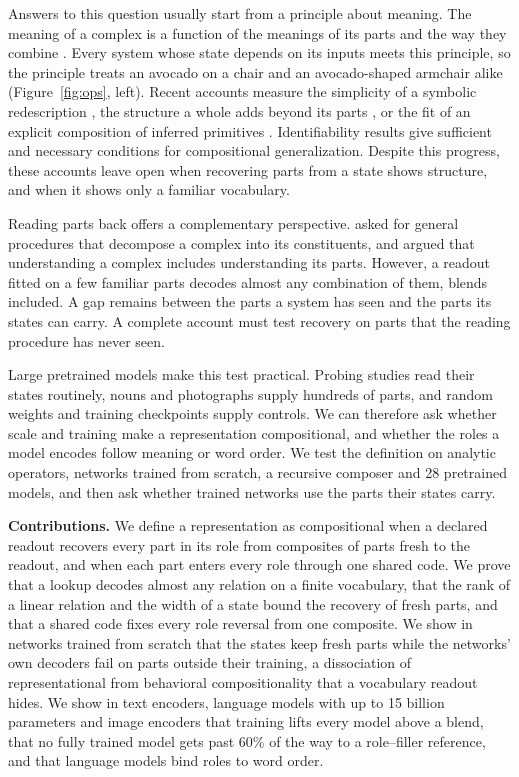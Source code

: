 \documentclass[10pt]{article}
\theoremstyle{plain}
\theoremstyle{remark}
\begin{document}
Answers to this question usually start from a principle about meaning. The meaning of a complex is a function of the meanings of its parts and the way they combine \citep{montague1970}. Every system whose state depends on its inputs meets this principle, so the principle treats an avocado on a chair and an avocado-shaped armchair alike (Figure~\ref{fig:ops}, left). Recent accounts measure the simplicity of a symbolic redescription \citep{elmoznino2024}, the structure a whole adds beyond its parts \citep{elmoznino2026}, or the fit of an explicit composition of inferred primitives \citep{andreas2019}. Identifiability results give sufficient \citep{lachapelle2023,wiedemer2024} and necessary \citep{uselis2026} conditions for compositional generalization. Despite this progress, these accounts leave open when recovering parts from a state shows structure, and when it shows only a familiar vocabulary.

Reading parts back offers a complementary perspective. \citet{vangelder1990} asked for general procedures that decompose a complex into its constituents, and \citet{fodor2002} argued that understanding a complex includes understanding its parts. However, a readout fitted on a few familiar parts decodes almost any combination of them, blends included. A gap remains between the parts a system has seen and the parts its states can carry. A complete account must test recovery on parts that the reading procedure has never seen.

Large pretrained models make this test practical. Probing studies read their states routinely, nouns and photographs supply hundreds of parts, and random weights and training checkpoints supply controls. We can therefore ask whether scale and training make a representation compositional, and whether the roles a model encodes follow meaning or word order. We test the definition on analytic operators, networks trained from scratch, a recursive composer and 28 pretrained models, and then ask whether trained networks use the parts their states carry.

\textbf{Contributions.} We define a representation as compositional when a declared readout recovers every part in its role from composites of parts fresh to the readout, and when each part enters every role through one shared code. We prove that a lookup decodes almost any relation on a finite vocabulary, that the rank of a linear relation and the width of a state bound the recovery of fresh parts, and that a shared code fixes every role reversal from one composite. We show in networks trained from scratch that the states keep fresh parts while the networks' own decoders fail on parts outside their training, a dissociation of representational from behavioral compositionality that a vocabulary readout hides. We show in text encoders, language models with up to 15 billion parameters and image encoders that training lifts every model above a blend, that no fully trained model gets past 60\% of the way to a role--filler reference, and that language models bind roles to word order.
\end{document}
